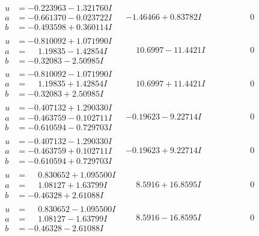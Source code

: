 \documentclass[1p]{elsarticle_modified}
\theoremstyle{definition}
\begin{document}
$$\begin{array}{c|c|c}
\begin{aligned}
u &= -0.223963 - 1.321760 I \\
a &= -0.661370 - 0.023722 I \\
b &= -0.493598 + 0.360114 I\end{aligned}
 & -1.46466 + 0.83782 I & \phantom{-0.000000 } 0 \\ \hline\begin{aligned}
u &= -0.810092 + 1.071990 I \\
a &= \phantom{-}1.19835 - 1.42854 I \\
b &= -0.32083 - 2.50985 I\end{aligned}
 & \phantom{-}10.6997 - 11.4421 I & \phantom{-0.000000 } 0 \\ \hline\begin{aligned}
u &= -0.810092 - 1.071990 I \\
a &= \phantom{-}1.19835 + 1.42854 I \\
b &= -0.32083 + 2.50985 I\end{aligned}
 & \phantom{-}10.6997 + 11.4421 I & \phantom{-0.000000 } 0 \\ \hline\begin{aligned}
u &= -0.407132 + 1.290330 I \\
a &= -0.463759 - 0.102711 I \\
b &= -0.610594 - 0.729703 I\end{aligned}
 & -0.19623 - 9.22714 I & \phantom{-0.000000 } 0 \\ \hline\begin{aligned}
u &= -0.407132 - 1.290330 I \\
a &= -0.463759 + 0.102711 I \\
b &= -0.610594 + 0.729703 I\end{aligned}
 & -0.19623 + 9.22714 I & \phantom{-0.000000 } 0 \\ \hline\begin{aligned}
u &= \phantom{-}0.830652 + 1.095500 I \\
a &= \phantom{-}1.08127 + 1.63799 I \\
b &= -0.46328 + 2.61088 I\end{aligned}
 & \phantom{-}8.5916 + 16.8595 I & \phantom{-0.000000 } 0 \\ \hline\begin{aligned}
u &= \phantom{-}0.830652 - 1.095500 I \\
a &= \phantom{-}1.08127 - 1.63799 I \\
b &= -0.46328 - 2.61088 I\end{aligned}
 & \phantom{-}8.5916 - 16.8595 I & \phantom{-0.000000 } 0 \\ \hline\begin{aligned}

\end{aligned}
\end{array}$$
\end{document}
